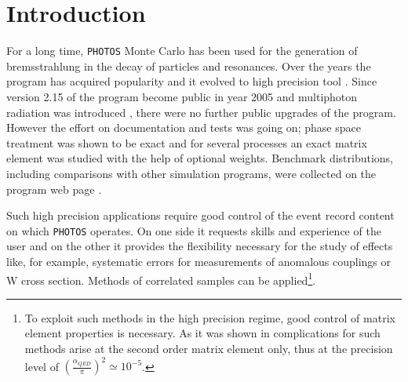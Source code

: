 \documentclass[]{Photos_interface_design}
\begin{document}
\maketitle

\tableofcontents{}

\newpage

\section{Introduction}
For a long time, {\tt PHOTOS} Monte Carlo \cite{Barberio:1990ms,Barberio:1993qi} 
has been used for the generation of bremsstrahlung in the decay of particles and resonances.
Over the years the program has acquired
popularity and it evolved to high 
precision tool \cite{Golonka:2006tw}. Since version 2.15 of the program become 
public in year 2005 and multiphoton radiation was 
introduced \cite{Golonka:2005pn}, there were no further public upgrades 
of the program. However the effort on documentation and tests was going on;
 phase space treatment was shown to be 
exact \cite{Nanava:2006vv} and for several 
processes \cite{Golonka:2006tw,Nanava:2006vv,Nanava:2009vg}
an exact matrix element was studied with the help of optional weights.
Benchmark distributions, including comparisons with  
other simulation programs, were collected on the program web page \cite{Photos_tests}. 

 Such high precision applications require good control of the event record content on which {\tt PHOTOS} operates. On one side it 
requests skills and experience of the user and on the other it provides 
the flexibility necessary for the study of effects like, for example, systematic errors for 
measurements of anomalous couplings or W cross section. Methods of 
correlated samples  can be applied\footnote{To exploit such methods in 
the high precision regime, good control of matrix element properties is necessary.
As it was shown in \cite{Kleiss:1990jv} complications for such methods arise at the second order matrix element only, thus at the precision level of 
$(\frac{\alpha_{QED}}{\pi})^2 \simeq 10^{-5}$.}. 
\end{document}
